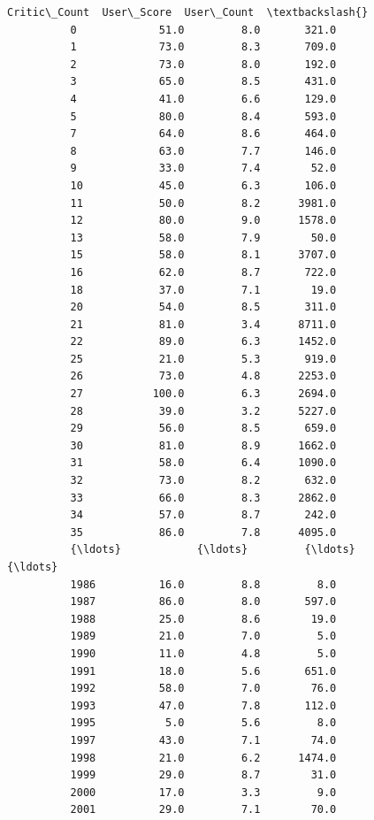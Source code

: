 \documentclass[11pt]{article}
\begin{document}
\begin{Verbatim}[commandchars=\\\{\}]
                Critic\_Count  User\_Score  User\_Count  \textbackslash{}
          0             51.0         8.0       321.0   
          1             73.0         8.3       709.0   
          2             73.0         8.0       192.0   
          3             65.0         8.5       431.0   
          4             41.0         6.6       129.0   
          5             80.0         8.4       593.0   
          7             64.0         8.6       464.0   
          8             63.0         7.7       146.0   
          9             33.0         7.4        52.0   
          10            45.0         6.3       106.0   
          11            50.0         8.2      3981.0   
          12            80.0         9.0      1578.0   
          13            58.0         7.9        50.0   
          15            58.0         8.1      3707.0   
          16            62.0         8.7       722.0   
          18            37.0         7.1        19.0   
          20            54.0         8.5       311.0   
          21            81.0         3.4      8711.0   
          22            89.0         6.3      1452.0   
          25            21.0         5.3       919.0   
          26            73.0         4.8      2253.0   
          27           100.0         6.3      2694.0   
          28            39.0         3.2      5227.0   
          29            56.0         8.5       659.0   
          30            81.0         8.9      1662.0   
          31            58.0         6.4      1090.0   
          32            73.0         8.2       632.0   
          33            66.0         8.3      2862.0   
          34            57.0         8.7       242.0   
          35            86.0         7.8      4095.0   
          {\ldots}            {\ldots}         {\ldots}         {\ldots}   
          1986          16.0         8.8         8.0   
          1987          86.0         8.0       597.0   
          1988          25.0         8.6        19.0   
          1989          21.0         7.0         5.0   
          1990          11.0         4.8         5.0   
          1991          18.0         5.6       651.0   
          1992          58.0         7.0        76.0   
          1993          47.0         7.8       112.0   
          1995           5.0         5.6         8.0   
          1997          43.0         7.1        74.0   
          1998          21.0         6.2      1474.0   
          1999          29.0         8.7        31.0   
          2000          17.0         3.3         9.0   
          2001          29.0         7.1        70.0   

\end{Verbatim}
\end{document}
